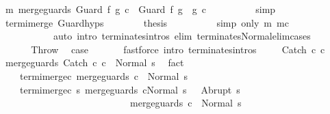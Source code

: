 \begin{isabellebody}
\ m{\isacharcolon}\ {\isachardoublequoteopen}merge{\isacharunderscore}guards\ {\isacharparenleft}Guard\ f\ g\ c{\isacharparenright}\ {\isacharequal}\ Guard\ f\ {\isacharparenleft}g\ {\isasyminter}\ g{\isacharprime}{\isacharparenright}\ c{\isacharprime}{\isachardoublequoteclose}\isanewline
\ \ \ \ \ \ \ \ \isamarkupfalse%
\ simp\isanewline
\ \ \ \ \ \ \isamarkupfalse%
\ termi{\isacharunderscore}merge\ Guard{\isachardot}hyps\isanewline
\ \ \ \ \ \ \isamarkupfalse%
\ {\isacharquery}thesis\isanewline
\ \ \ \ \ \ \ \ \isamarkupfalse%
\ {\isacharparenleft}simp\ only{\isacharcolon}\ m\ mc{\isacharparenright}\isanewline
\ \ \ \ \ \ \ \ \ \ \ {\isacharparenleft}auto\ intro{\isacharcolon}\ terminates{\isachardot}intros\ elim{\isacharcolon}\ terminates{\isacharunderscore}Normal{\isacharunderscore}elim{\isacharunderscore}cases{\isacharparenright}\isanewline
\ \ \ \ \isamarkupfalse%
\isanewline
\ \ \isamarkupfalse%
\isanewline
{}\isamarkupfalse%
\isanewline
\ \ \isamarkupfalse%
\ Throw\ \isamarkupfalse%
\ {\isacharquery}case\ \isanewline
\ \ \ \ \isamarkupfalse%
\ {\isacharparenleft}fastforce\ intro{\isacharcolon}\ terminates{\isachardot}intros\ {\isacharparenright}\isanewline
{}\isamarkupfalse%
\isanewline
\ \ \isamarkupfalse%
\ {\isacharparenleft}Catch\ c{}\ c{}{\isacharparenright}\ \isanewline
\ \ \isamarkupfalse%
\ {\isachardoublequoteopen}{\isasymGamma}{\isasymturnstile}merge{\isacharunderscore}guards\ {\isacharparenleft}Catch\ c{}\ c{}{\isacharparenright}\ {\isasymdown}\ Normal\ s{\isachardoublequoteclose}\ \isamarkupfalse%
\ fact\isanewline
\ \ \isamarkupfalse%
\ \isamarkupfalse%
\isanewline
\ \ \ \ termi{\isacharunderscore}merge{\isacharunderscore}c{}{\isacharcolon}\ {\isachardoublequoteopen}{\isasymGamma}{\isasymturnstile}merge{\isacharunderscore}guards\ c{}\ {\isasymdown}\ Normal\ s{\isachardoublequoteclose}\ \isanewline
\ \ \ \ termi{\isacharunderscore}merge{\isacharunderscore}c{}{\isacharcolon}\ {\isachardoublequoteopen}{\isasymforall}s{\isacharprime}{\isachardot}\ {\isasymGamma}{\isasymturnstile}{\isasymlangle}merge{\isacharunderscore}guards\ c{}{\isacharcomma}Normal\ s\ {\isasymrangle}\ {\isasymRightarrow}\ Abrupt\ s{\isacharprime}\ {\isasymlongrightarrow}\ \isanewline
\ \ \ \ \ \ \ \ \ \ \ \ \ \ \ \ \ \ \ \ \ \ \ \ \ \ \ {\isasymGamma}{\isasymturnstile}merge{\isacharunderscore}guards\ c{}\ {\isasymdown}\ Normal\ s{\isacharprime}{\isachardoublequoteclose}\isanewline

\end{isabellebody}
